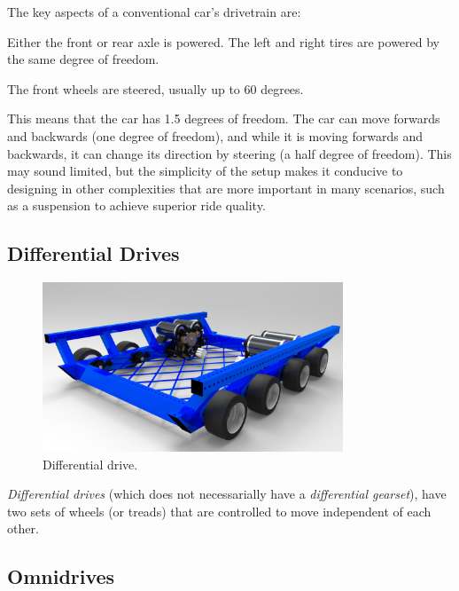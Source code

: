\documentclass[10pt,letterpaper]{book}
\begin{document}
The key aspects of a conventional car's drivetrain are:
\begin{asparaenum}
	\item Either the front or rear axle is powered. The left and right tires are powered by the same degree of freedom.
	\item The front wheels are steered, usually up to 60 degrees.
\end{asparaenum}

This means that the car has 1.5 degrees of freedom. The car can move forwards and backwards (one degree of freedom), and while it is moving forwards and backwards, it can change its direction by steering (a half degree of freedom). This may sound limited, but the simplicity of the setup makes it conducive to designing in other complexities that are more important in many scenarios, such as a suspension to achieve superior ride quality.

\subsection{Differential Drives}
\begin{figure}[H]
	\includegraphics[width=0.8\textwidth]{imgs/drivetrain_differential.jpeg}
	\caption{Differential drive.}
\end{figure}

\textit{Differential drives} (which does not necessarially have a \textit{differential gearset}), have two sets of wheels (or treads) that are controlled to move independent of each other.



\subsection{Omnidrives}
\end{document}

